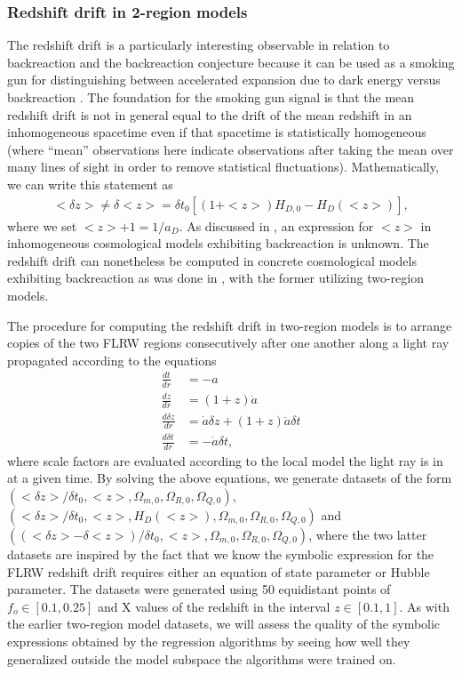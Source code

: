 \documentclass[a4paper,11pt]{article}
\begin{document}
	\subsubsection{Redshift drift in 2-region models}
		The redshift drift is a particularly interesting observable in relation to backreaction and the backreaction conjecture because it can be used as a smoking gun for distinguishing between accelerated expansion due to dark energy versus backreaction \cite{smokinggun1, smokinggun2, smokinggun3, smokinggun4}. The foundation for the smoking gun signal is that the mean redshift drift is not in general equal to the drift of the mean redshift in an inhomogeneous spacetime even if that spacetime is statistically homogeneous (where ``mean'' observations here indicate observations after taking the mean over many lines of sight in order to remove statistical fluctuations). Mathematically, we can write this statement as
		\begin{align}
		    <\delta z>\neq \delta <z> = \delta t_0[(1+<z>)H_{D,0}-H_D(<z>)],
		\end{align}
		where we set $<z> +1  =1/a_D$. As discussed in \cite{zdrift1,zdrift2}, an expression for $<z>$ in inhomogeneous cosmological models exhibiting backreaction is unknown. The redshift drift can nonetheless be computed in concrete cosmological models exhibiting backreaction as was done in \cite{smokinggun1,smokinggun2}, with the former utilizing two-region models.

		The procedure for computing the redshift drift in two-region models is to arrange copies of the two FLRW regions consecutively after one another along a light ray propagated according to the equations
		\begin{align}
			\frac{dt}{dr} &= -a\\
			\frac{dz}{dr}& = (1+z)\dot a\\
			\frac{d\delta z}{dr} &= \dot a\delta z + (1+z)\ddot a\delta t\\
			\frac{d\delta t}{dr} &=-\dot a	\delta t,
		\end{align}
		where scale factors are evaluated according to the local model the light ray is in at a given time.
		\newline\newline
		By solving the above equations, we generate datasets of the form $(<\delta z>/\delta t_0, <z>, \Omega_{m,0}, \Omega_{R,0}, \Omega_{Q,0})$,  $(<\delta z>/\delta t_0, <z>, H_D(<z>),\Omega_{m,0}, \Omega_{R,0}, \Omega_{Q,0})$ and $((<\delta z> - \delta <z>)/\delta t_0, <z>, \Omega_{m,0}, \Omega_{R,0}, \Omega_{Q,0})$, where the two latter datasets are inspired by the fact that we know the symbolic expression for the FLRW redshift drift requires either an equation of state parameter or Hubble parameter. The datasets were generated using 50 equidistant points of $f_o\in[0.1,0.25]$ and X values of the redshift in the interval $z\in[0.1,1]$. 
		\newline\newline
		As with the earlier two-region model datasets, we will assess the quality of the symbolic expressions obtained by the regression algorithms by seeing how well they generalized outside the model subspace the algorithms were trained on.
\end{document}
